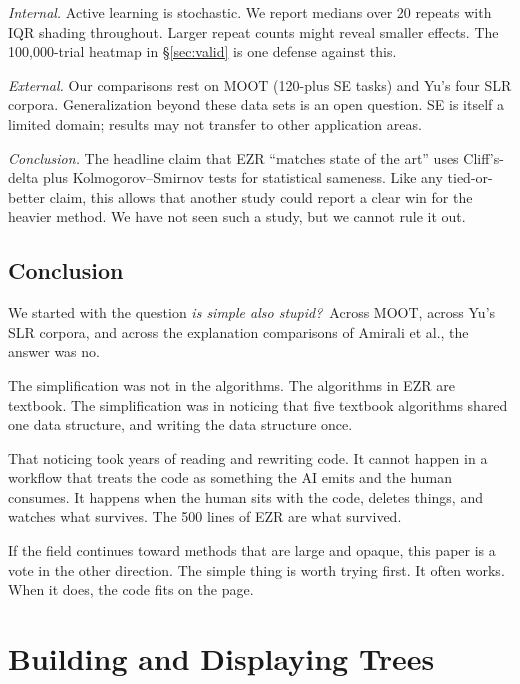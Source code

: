 \documentclass[AMA,STIX2COL]{WileyNJDv5}
\newcommand{\IT}{{\sffamily EZR}}
\begin{document}
\textit{Internal.} Active learning is stochastic. We report
medians over 20 repeats with IQR shading throughout. Larger
repeat counts might reveal smaller effects. The 100,000-trial
heatmap in \S\ref{sec:valid} is one defense against this.

\textit{External.} Our comparisons rest on MOOT (120-plus SE
tasks) and Yu's four SLR corpora. Generalization beyond these
data sets is an open question. SE is itself a limited domain;
results may not transfer to other application areas.

\textit{Conclusion.} The headline claim that \IT{} ``matches
state of the art'' uses Cliff's-delta plus
Kolmogorov--Smirnov tests for statistical sameness. Like any
tied-or-better claim, this allows that another study could
report a clear win for the heavier method. We have not seen
such a study, but we cannot rule it out.

\subsection{Conclusion}

We started with the question {\em is simple also stupid?}\
Across MOOT, across Yu's SLR corpora, and across the
explanation comparisons of Amirali et al., the answer was no.

The simplification was not in the algorithms. The algorithms in
\IT{} are textbook. The simplification was in noticing that
five textbook algorithms shared one data structure, and writing
the data structure once.

That noticing took years of reading and rewriting code.
It cannot happen in a workflow that treats the code as something
the AI emits and the human consumes. It happens when the human
sits with the code, deletes things, and watches what survives.
The 500 lines of \IT{} are what survived.

If the field continues toward methods that are large and
opaque, this paper is a vote in the other direction. The simple
thing is worth trying first. It often works. When it does, the
code fits on the page.

\appendix
\section{Building and Displaying Trees}\label{app:trees}




\end{document}
